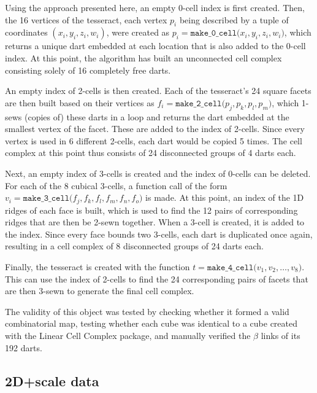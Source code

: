 Using the approach presented here, an empty 0-cell index is first created.
Then, the 16 vertices of the tesseract, each vertex $p_{i}$ being described by a tuple of coordinates $(x_{i},y_{i},z_{i},w_{i})$, were created as $p_{i}=\texttt{make\_0\_cell(}x_{i},y_{i},z_{i},w_{i}\texttt{)}$, which returns a unique dart embedded at each location that is also added to the 0-cell index.
At this point, the algorithm has built an unconnected cell complex consisting solely of 16 completely free darts.

An empty index of 2-cells is then created.
Each of the tesseract's 24 square facets are then built based on their vertices as $f_{i}=\texttt{make\_2\_cell(}p_{j},p_{k},p_{l},p_{m}\texttt{)}$, which 1-sews (copies of) these darts in a loop and returns the dart embedded at the smallest vertex of the facet.
These are added to the index of 2-cells.
Since every vertex is used in 6 different 2-cells, each dart would be copied 5 times.
The cell complex at this point thus consists of 24 disconnected groups of 4 darts each.

Next, an empty index of 3-cells is created and the index of 0-cells can be deleted.
For each of the 8 cubical 3-cells, a function call of the form $v_{i}=\texttt{make\_3\_cell(}f_{j},f_{k},f_{l},f_{m},f_{n},f_{o}\texttt{)}$ is made.
At this point, an index of the 1D ridges of each face is built, which is used to find the 12 pairs of corresponding ridges that are then be 2-sewn together.
When a 3-cell is created, it is added to the index.
Since every face bounds two 3-cells, each dart is duplicated once again, resulting in a cell complex of 8 disconnected groups of 24 darts each.

Finally, the tesseract is created with the function $t=\texttt{make\_4\_cell(}v_{1},v_{2},\dots,v_{8}\texttt{)}$.
This can use the index of 2-cells to find the 24 corresponding pairs of facets that are then 3-sewn to generate the final cell complex.

The validity of this object was tested by checking whether it formed a valid combinatorial map, testing whether each cube was identical to a cube created with the Linear Cell Complex package, and manually verified the $\beta$ links of its 192 darts.

\subsection*{2D+scale data}

